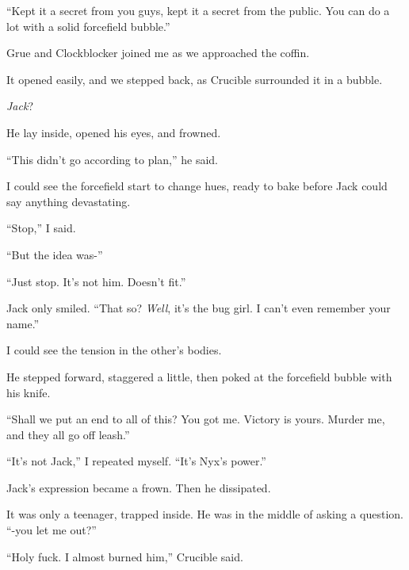 ``Kept it a secret from you guys, kept it a secret from the public.  You can do a lot with a solid forcefield bubble.''



Grue and Clockblocker joined me as we approached the coffin.



It opened easily, and we stepped back, as Crucible surrounded it in a bubble.



\emph{Jack}?



He lay inside, opened his eyes, and frowned.



``This didn't go according to plan,'' he said.



I could see the forcefield start to change hues, ready to bake before Jack could say anything devastating.



``Stop,'' I said.



``But the idea was-''



``Just stop.  It's not him.  Doesn't fit.''



Jack only smiled.  ``That so?  \emph{Well}, it's the bug girl.  I can't even remember your name.''



I could see the tension in the other's bodies.



He stepped forward, staggered a little, then poked at the forcefield bubble with his knife.



``Shall we put an end to all of this?  You got me.  Victory is yours.  Murder me, and they all go off leash.''



``It's not Jack,'' I repeated myself.  ``It's Nyx's power.''



Jack's expression became a frown.  Then he dissipated.



It was only a teenager, trapped inside.  He was in the middle of asking a question.  ``-you let me out?''



``Holy fuck.  I almost burned him,'' Crucible said.



